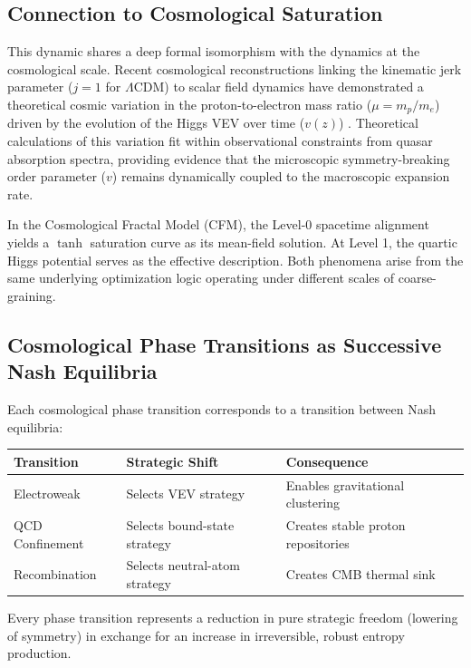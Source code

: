 \documentclass[12pt,a4paper]{article}
\theoremstyle{remark}
\begin{document}
\subsection{Connection to Cosmological Saturation}

This dynamic shares a deep formal isomorphism with the dynamics at the cosmological scale. Recent cosmological reconstructions linking the kinematic jerk parameter ($j = 1$ for $\Lambda$CDM) to scalar field dynamics have demonstrated a theoretical cosmic variation in the proton-to-electron mass ratio ($\mu = m_p/m_e$) driven by the evolution of the Higgs VEV over time ($v(z)$) \citep{HiggsVEV2024}. Theoretical calculations of this variation fit within observational constraints from quasar absorption spectra, providing evidence that the microscopic symmetry-breaking order parameter ($v$) remains dynamically coupled to the macroscopic expansion rate.

In the Cosmological Fractal Model (CFM), the Level-0 spacetime alignment yields a $\tanh$ saturation curve as its mean-field solution. At Level 1, the quartic Higgs potential serves as the effective description. Both phenomena arise from the same underlying optimization logic operating under different scales of coarse-graining.

\subsection{Cosmological Phase Transitions as Successive Nash Equilibria}

Each cosmological phase transition corresponds to a transition between Nash equilibria:

\begin{center}
\begin{tabular}{lll}
\toprule
\textbf{Transition} & \textbf{Strategic Shift} & \textbf{Consequence} \\
\midrule
Electroweak & Selects VEV strategy & Enables gravitational clustering \\
QCD Confinement & Selects bound-state strategy & Creates stable proton repositories \\
Recombination & Selects neutral-atom strategy & Creates CMB thermal sink \\
\bottomrule
\end{tabular}
\end{center}

Every phase transition represents a reduction in pure strategic freedom (lowering of symmetry) in exchange for an increase in irreversible, robust entropy production.
\end{document}
